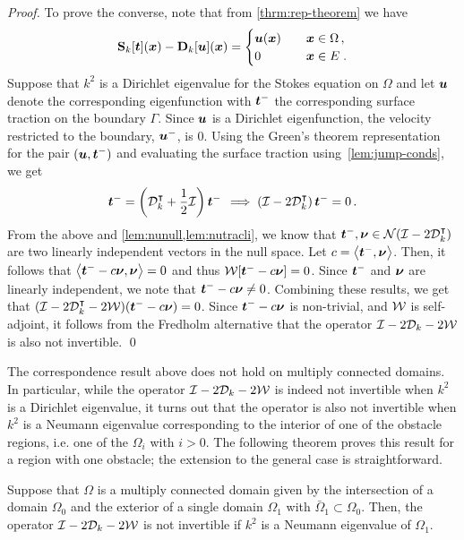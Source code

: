 \begin{proof}
To prove the converse, note that from \cref{thrm:rep-theorem} we have 
  \begin{equation} 
    {\bf S}_{k} [{\boldsymbol t}]({\boldsymbol x}) - {\bf D}_{k}[{\boldsymbol u}]({\boldsymbol x}) = \begin{cases} 
    {\boldsymbol u}({\boldsymbol x}) &\quad {\boldsymbol x} \in \Omega \, , \\
    0 &\quad {\boldsymbol x} \in E \; .
    \end{cases}
  \end{equation}
  Suppose that $k^2$ is a Dirichlet eigenvalue for the Stokes equation
  on $\Omega$ and let ${\boldsymbol u}$ denote the corresponding eigenfunction
  with ${\boldsymbol t}^{-}$ the corresponding surface traction on the
  boundary $\Gamma$.
  Since ${\boldsymbol u}$ is a Dirichlet eigenfunction, the velocity restricted
  to the boundary, ${\boldsymbol u}^{-}$, is $0$. 
  Using the Green's theorem representation for the pair
  $({\boldsymbol u},{\boldsymbol t}^{-})$ and evaluating the surface traction
  using~\cref{lem:jump-conds}, we get
  \begin{equation}
    {\boldsymbol t}^{-} = \left({\mathcal D}^{\intercal}_{k} + \frac{1}{2} \mathcal I\right) {\boldsymbol t}^{-} \,
    \implies \left(\mathcal I - 2{\mathcal D}^{\intercal}_{k} \right) 
    {\boldsymbol t}^{-} = 0 \, .
  \end{equation}
  From the above and \cref{lem:nunull,lem:nutracli},
  we know that ${\boldsymbol t}^{-}, {\boldsymbol \nu} \in {\mathcal N}(\mathcal I - 2{\mathcal D}^{\intercal}_{k})$
  are two linearly independent vectors in the null space.
  Let $c = \left< {\boldsymbol t}^{-},{\boldsymbol \nu} \right>$. Then, it
  follows that $\left<{\boldsymbol t}^{-} -c {\boldsymbol \nu}, {\boldsymbol \nu} \right> = 0$
  and thus ${\mathcal W}[{\boldsymbol t}^{-} - c{\boldsymbol \nu}] = 0$. 
  Since ${\boldsymbol t}^{-}$ and ${\boldsymbol \nu}$ are linearly independent, we note that
  ${\boldsymbol t}^{-} -c{\boldsymbol \nu} \neq 0$. Combining these results, we get that
  $(\mathcal I - 2{\mathcal D}^{\intercal}_{k} - 2{\mathcal W}) ({\boldsymbol t}^{-} - c{\boldsymbol \nu}) = 0$. 
  Since ${\boldsymbol t}^{-}-c{\boldsymbol \nu}$ is non-trivial, and ${\mathcal W}$ is
  self-adjoint, it follows from the Fredholm alternative
  that the operator $\mathcal I - 2{\mathcal D}_{k} - 2{\mathcal W}$ is also not
  invertible.
\qed
\end{proof}

The correspondence result above does not hold on multiply
connected domains.
In particular, while the operator $\mathcal I -2{\mathcal D}_{k} -2{\mathcal W}$ 
is indeed not invertible when $k^2$ is a Dirichlet eigenvalue,
it turns out that the operator is also not
invertible when $k^2$ is a Neumann eigenvalue
corresponding to the interior of one of the obstacle regions,
i.e. one of the $\Omega_{i}$ with $i > 0$. The following theorem
proves this result for a region with one obstacle;
the extension to the general case is straightforward.

\begin{theorem}
  Suppose that $\Omega$ is a multiply connected domain
  given by the intersection of a domain $\Omega_{0}$
  and the exterior of a single domain $\Omega_{1}$ with
  $ \bar\Omega_1 \subset \Omega_0$.
  Then, the operator $\mathcal I - 2{\mathcal D}_{k} - 2{\mathcal W}$ is not invertible
  if $k^2$ is a Neumann eigenvalue of $\Omega_{1}$.
\end{theorem}


